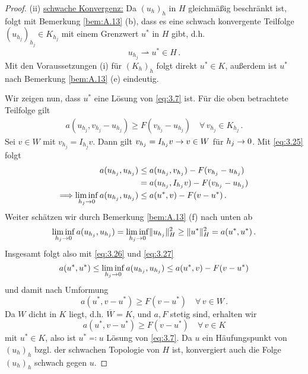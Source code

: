 \begin{proof}
(ii) \underline{schwache Konvergenz:} Da $(u_h)_h$ in $H$ gleichmäßig beschränkt ist, folgt mit Bemerkung \ref{bem:A.13} (b), dass es eine schwach konvergente Teilfolge $(u_{h_j})_{h_j} \in K_{h_j}$ mit einem Grenzwert $u^*$ in $H$ gibt, d.h.
\[
	u_{h_j} \rightharpoonup u^* \in H \, .
\]
Mit den Voraussetzungen (i) für $(K_h)_h$ folgt direkt $u^* \in K$, außerdem ist $u^*$ nach Bemerkung \ref{bem:A.13} (e) eindeutig.

Wir zeigen nun, dass $u^*$ eine Lösung von \eqref{eq:3.7} ist. Für die oben betrachtete Teilfolge gilt
\begin{align}\label{eq:3.25}
	a(u_{h_j},v_{h_j}-u_{h_j})\ge F(v_{h_j}-u_{h_j}) \quad \forall \, v_{h_j} \in K_{h_j} \, .
\end{align}
Sei $v \in W$ mit $v_{h_j} = I_{h_j} v$. Dann gilt $v_{h_j} = I_{h_j} v \rightarrow v \in W$ für $h_j \rightarrow 0$. Mit \eqref{eq:3.25} folgt
\begin{align}
	\notag a(u_{h_j},u_{h_j}) &\le a(u_{h_j},v_{h_j})-F(v_{h_j}-u_{h_j}) \\
	\notag & = a(u_{h_j},I_{h_j} v)-F(v_{h_j}-u_{h_j}) \\
	\label{eq:3.26} \Longrightarrow \liminf_{h_j\rightarrow 0} a(u_{h_j},u_{h_j}) & \le  a(u^*,v)-F(v-u^*) \, .
\end{align}
Weiter schätzen wir durch Bemerkung \ref{bem:A.13} (f) nach unten ab
\begin{align}\label{eq:3.27}
	\liminf_{h_j\rightarrow 0} a(u_{h_j},u_{h_j}) = \liminf_{h_j\rightarrow 0} \lVert u_{h_j}\rVert_H^2 \ge \lVert u^*\rVert_H^2 = a(u^*,u^*) \, .
\end{align}
Insgesamt folgt also mit \eqref{eq:3.26} und \eqref{eq:3.27}
\[
	a(u^*,u^*) \le \liminf_{h_j\rightarrow 0} a(u_{h_j},u_{h_j}) \le   a(u^*,v)-F(v-u^*)
\]
und damit nach Umformung
\[
	a(u^*,v-u^*)\ge F(v-u^*) \quad \forall \, v \in W \, .
\]
Da $W$ dicht in $K$ liegt, d.h. $\overline W = K$, und $a, F$ stetig sind, erhalten wir
\[
	a(u^*,v-u^*)\ge F(v-u^*) \quad \forall \, v \in K 
\]
mit $u^*\in K$, also ist $u^*\eqqcolon u$ Lösung von \eqref{eq:3.7}. Da $u$ ein Häufungspunkt von $(u_h)_h$ bzgl. der schwachen Topologie von $H$ ist, konvergiert auch die Folge $(u_h)_h$ schwach gegen $u$.


\end{proof}
